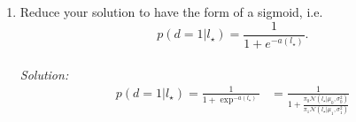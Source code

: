\documentclass[12pt,a4paper]{article}
\begin{document}
\begin{enumerate}
  
  \item Reduce your solution to have the form of a sigmoid, i.e. 
      \begin{equation*}
         p(d=1|l_{\star}) = \frac{1}{1+e^{-a(l_{\star})}}.
      \end{equation*}
      \\
	      \emph{Solution:} \\
		      \begin{align*}
		      	p(d = 1 | l_{\star}) = \frac{1}{1 + \exp ^{-a(l_{\star})}} 
		      	&= \frac{1}{1 + \frac{\pi_0 \mathcal{N} (l_{\star} | \mu_{0}, \sigma_{0}^{2})}{\pi_1 \mathcal{N} (l_{\star} | \mu_{1}, \sigma_{1}^{2})}} \\
		      \end{align*}
   
  
\end{enumerate}
\end{document}
